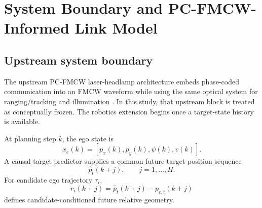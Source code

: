 \documentclass[journal]{IEEEtran}
\begin{document}
\begin{table}[t]
\caption{Representative positioning. The table identifies close methodological axes; it is not a systematic review.}
\label{tab:positioning}
\centering
\small
{}
\end{table}


\section{System Boundary and PC-FMCW-Informed Link Model}
\subsection{Upstream system boundary}
The upstream PC-FMCW laser-headlamp architecture embeds phase-coded communication into an FMCW waveform while using the same optical system for ranging/tracking and illumination \cite{liu2026}. In this study, that upstream block is treated as conceptually frozen. The robotics extension begins once a target-state history is available.

At planning step $k$, the ego state is
\begin{equation}
x_e(k)=[p_x(k),p_y(k),\psi(k),v(k)].
\end{equation}
A causal target predictor supplies a common future target-position sequence
\begin{equation}
\hat p_t(k+j),\qquad j=1,\ldots,H.
\end{equation}
For candidate ego trajectory $\tau_i$,
\begin{equation}
r_i(k+j)=\hat p_t(k+j)-p_{e,i}(k+j)
\end{equation}
defines candidate-conditioned future relative geometry.
\end{document}
